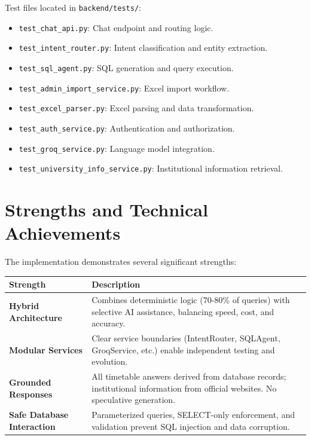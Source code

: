 \begin{fig}[H]
Test files located in \texttt{backend/tests/}:
\begin{itemize}
    \item \texttt{test\_chat\_api.py}: Chat endpoint and routing logic.
    \item \texttt{test\_intent\_router.py}: Intent classification and entity extraction.
    \item \texttt{test\_sql\_agent.py}: SQL generation and query execution.
    \item \texttt{test\_admin\_import\_service.py}: Excel import workflow.
    \item \texttt{test\_excel\_parser.py}: Excel parsing and data transformation.
    \item \texttt{test\_auth\_service.py}: Authentication and authorization.
    \item \texttt{test\_groq\_service.py}: Language model integration.
    \item \texttt{test\_university\_info\_service.py}: Institutional information retrieval.
\end{itemize}

\section{Strengths and Technical Achievements}

The implementation demonstrates several significant strengths:

\begin{center}
\begin{tabular}{|p{3.5cm}|p{10cm}|}
\hline
\textbf{Strength} & \textbf{Description} \\
\hline

\textbf{Hybrid Architecture} & 
Combines deterministic logic (70-80\% of queries) with selective AI assistance, balancing speed, cost, and accuracy. \\
\hline

\textbf{Modular Services} & 
Clear service boundaries (IntentRouter, SQLAgent, GroqService, etc.) enable independent testing and evolution. \\
\hline

\textbf{Grounded Responses} & 
All timetable answers derived from database records; institutional information from official websites. No speculative generation. \\
\hline

\textbf{Safe Database Interaction} & 
Parameterized queries, SELECT-only enforcement, and validation prevent SQL injection and data corruption. \\
\hline


\end{tabular}
\end{center}
\end{fig}
